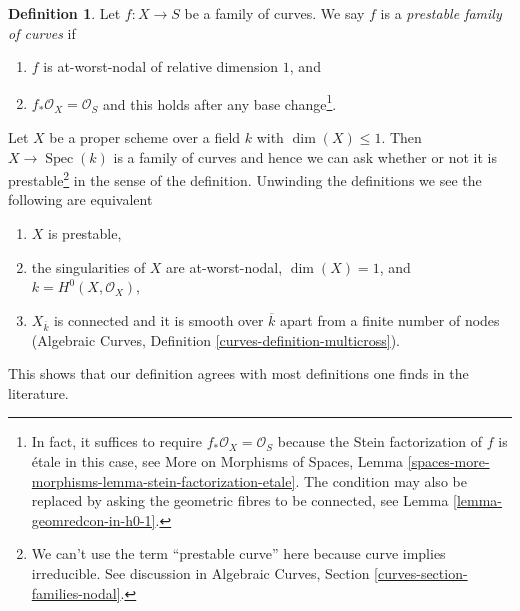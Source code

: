 \documentclass{stacks-project}
\theoremstyle{plain}
\theoremstyle{definition}
\newtheorem{definition}[subsection]{Definition}
\theoremstyle{remark}
\numberwithin{equation}{subsection}
\def\Spec{\mathop{\mathrm{Spec}}}
\begin{document}
\begin{definition}
\label{definition-prestable}
Let $f : X \to S$ be a family of curves. We say $f$ is a
{\it prestable family of curves} if
\begin{enumerate}
\item $f$ is at-worst-nodal of relative dimension $1$, and
\item $f_*\mathcal{O}_X = \mathcal{O}_S$ and this holds after
any base change\footnote{In fact, it suffices to require
$f_*\mathcal{O}_X = \mathcal{O}_S$ because the Stein factorization
of $f$ is \'etale in this case, see
More on Morphisms of Spaces, Lemma
\ref{spaces-more-morphisms-lemma-stein-factorization-etale}.
The condition may also be replaced by asking the geometric
fibres to be connected, see Lemma \ref{lemma-geomredcon-in-h0-1}.}.
\end{enumerate}
\end{definition}

\noindent
Let $X$ be a proper scheme over a field $k$ with $\dim(X) \leq 1$.
Then $X \to \Spec(k)$ is a family of curves and hence we can ask
whether or not it is prestable\footnote{We can't use the term
``prestable curve'' here because curve implies irreducible. See
discussion in Algebraic Curves, Section \ref{curves-section-families-nodal}.}
in the sense of the definition. Unwinding the definitions we see
the following are equivalent
\begin{enumerate}
\item $X$ is prestable,
\item the singularities of $X$ are at-worst-nodal, $\dim(X) = 1$,
and $k = H^0(X, \mathcal{O}_X)$,
\item $X_{\overline{k}}$ is connected and it is smooth over $\overline{k}$
apart from a finite number of nodes
(Algebraic Curves, Definition \ref{curves-definition-multicross}).
\end{enumerate}
This shows that our definition agrees with most definitions one finds
in the literature.
\end{document}
